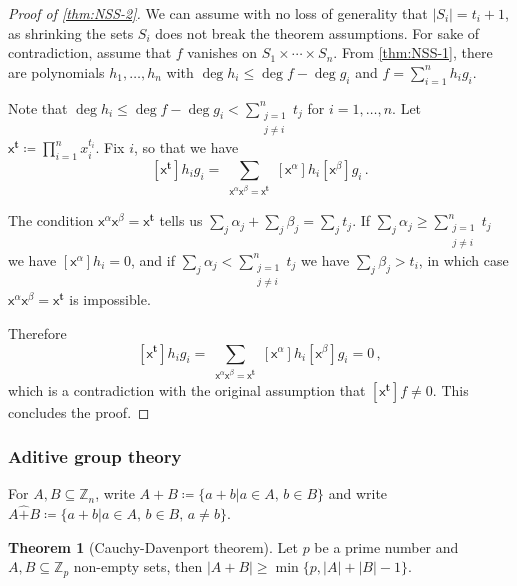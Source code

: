 \documentclass[12pt]{amsart}
\theoremstyle{definition}
\newtheorem{thm}{Theorem}[section]
\newcommand{\Z}{\mathbb{Z}}
\newcommand{\vx}{\mathsf{x}}
\begin{document}
\begin{proof}[Proof of \cref{thm:NSS-2}]
We can assume with no loss of generality that $|S_i| = t_i + 1$, as shrinking the sets $S_i$ does not break the theorem assumptions.
For sake of contradiction, assume that $f$ vanishes on $S_1\times \cdots \times S_n$.
From \cref{thm:NSS-1}, there are polynomials $h_1, \ldots, h_n$ with $\deg h_i \leq \deg f - \deg g_i $ and $f = \sum_{i=1}^n h_ig_i$.

Note that $\deg h_i \leq \deg f - \deg g_i < \sum_{\substack{j = 1 \\ j \neq i}}^n t_j$ for $i=1, \ldots, n$.
Let $ \vx^\mathbf{t} \coloneqq \prod_{i=1}^n x_i^{t_i} $.
Fix $i$, so that we have
$$ \left[  \vx^\mathbf{t} \right]  h_i g_i  = \sum_{\substack{\vx^\alpha \vx^\beta = \vx^\mathbf{t}}} [\vx^\alpha]h_i [\vx^\beta]g_i \, . $$

The condition $\vx^\alpha \vx^\beta = \vx^\mathbf{t}$ tells us $ \sum_j \alpha_j + \sum_j \beta_j = \sum_j t_j$.
If $\sum_j \alpha_j \geq \sum_{\substack{j = 1 \\ j \neq i}}^n t_j$ we have $[\vx^\alpha]h_i = 0 $, and if  $\sum_j \alpha_j  < \sum_{\substack{j = 1 \\ j \neq i}}^n t_j$ we have $ \sum_j \beta_j > t_i$, in which case $\vx^\alpha \vx^\beta = \vx^\mathbf{t} $ is impossible.

Therefore 
$$ \left[  \vx^\mathbf{t} \right]  h_i g_i  = \sum_{\substack{\vx^\alpha \vx^\beta = \vx^\mathbf{t}}} [\vx^\alpha]h_i [\vx^\beta]g_i = 0\, , $$
which is a contradiction with the original assumption that $  \left[  \vx^\mathbf{t} \right] f \neq 0$.
This concludes the proof.
\end{proof}

\subsubsection*{Aditive group theory}

For $A, B\subseteq \Z_n$, write $A+B \coloneqq \{a+b | a\in A, \, b\in B\}$ and write $A\hat{+}B \coloneqq \{a+b | a\in A, \, b\in B, \, a \neq b\}$.


\begin{thm}[Cauchy-Davenport theorem]
Let $p$ be a prime number and $A, B\subseteq \Z_p$ non-empty sets, then $|A+B| \geq \min \{p, |A| + |B| - 1\}$.
\end{thm}
\end{document}

